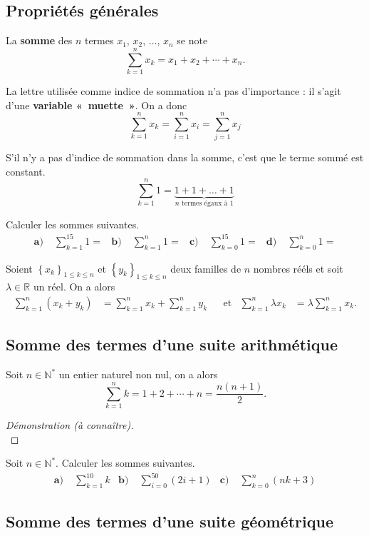 \documentclass[11pt]{article}
\begin{document}
\subsection{Propriétés générales}
\begin{notation}
  La \textbf{somme} des $n$ termes $x_1$, $x_2$, $\dots$, $x_n$ se note
  \[
    \sum_{k=1}^n x_k = x_1 + x_2 + \cdots + x_n.
  \]
\end{notation}
\begin{rmq}
  La lettre utilisée comme indice de sommation n'a pas d'importance : il s'agit
  d'une \textbf{variable «~muette~»}. On a donc
  \[
    \sum_{k=1}^n x_k =
    \sum_{i=1}^n x_i =
    \sum_{j=1}^n x_j
  \]
\end{rmq}
\begin{prop}
S'il n'y a pas d'indice de sommation dans la somme, c'est que le terme sommé
est constant.
  \[
    \sum_{k=1}^{n} 1 = \underbrace{1+1+\dots+1}_{n\text{ termes égaux à }1}
  \]
\end{prop}
\begin{app}
  Calculer les sommes suivantes.
  \begin{align*}
    \textbf{a)}\; & \sum_{k=1}^{15} 1 = &
    \textbf{b)}\; & \sum_{k=1}^{n} 1 = &
    \textbf{c)}\; & \sum_{k=0}^{15} 1 = &
    \textbf{d)}\; & \sum_{k=0}^{n} 1 =
  \end{align*}
\end{app}
\begin{prop}
  Soient $\left\{ x_k \right\}_{1\leq k \leq n}$ et $\left\{ y_k \right\}_{1\leq
  k \leq n}$ deux familles de $n$ nombres rééls et soit $\lambda\in\mathbb{R}$
  un réel. On a alors
  \begin{align*}
    \sum_{k=1}^n\left( x_k+y_k \right) &= \sum_{k=1}^nx_k+\sum_{k=1}^ny_k &
    &\text{et}&
    \sum_{k=1}^n\lambda x_k &= \lambda\sum_{k=1}^nx_k.
  \end{align*}
\end{prop}
\subsection{Somme des termes d'une suite arithmétique}
\begin{thm}
  Soit $n\in\mathbb{N}^*$ un entier naturel non nul, on a alors
  \[
    \sum_{k=1}^n k = 1+2+\cdots+n = \frac{n(n+1)}{2}.
  \]
\end{thm}
\begin{proof}[Démonstration (à connaître)]
  ~\vspace{3cm}\\
\end{proof}
\begin{app}
  Soit $n\in\mathbb{N}^*$. Calculer les sommes suivantes.
  \begin{align*}
    \textbf{a)}\;& \sum_{k=1}^{10} k &
    \textbf{b)}\;& \sum_{i=0}^{50} \left( 2i+1 \right) &
    \textbf{c)}\;& \sum_{k=0}^{n} (nk+3)
  \end{align*}

\end{app}
\subsection{Somme des termes d'une suite géométrique}
\end{document}
